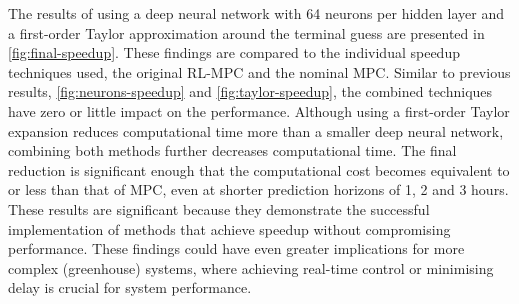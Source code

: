 The results of using a deep neural network with 64 neurons per hidden layer and a first-order Taylor approximation around the terminal guess are presented in \autoref{fig:final-speedup}. These findings are compared to the individual speedup techniques used, the original RL-MPC and the nominal MPC. Similar to previous results, \autoref{fig:neurons-speedup} and \autoref{fig:taylor-speedup}, the combined techniques have zero or little impact on the performance. Although using a first-order Taylor expansion reduces computational time more than a smaller deep neural network, combining both methods further decreases computational time. The final reduction is significant enough that the computational cost becomes equivalent to or less than that of MPC, even at shorter prediction horizons of 1, 2 and 3 hours. These results are significant because they demonstrate the successful implementation of methods that achieve speedup without compromising performance. These findings could have even greater implications for more complex (greenhouse) systems, where achieving real-time control or minimising delay is crucial for system performance.


